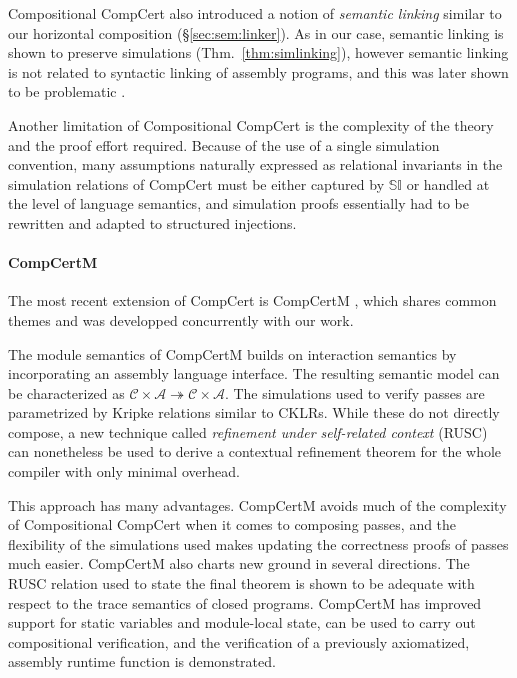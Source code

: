 \documentclass[sigplan,10pt,review,anonymous]{acmart}
\begin{document}
Compositional CompCert also introduced a notion of \emph{semantic linking}
similar to our horizontal composition
(\S\ref{sec:sem:linker}).
As in our case,
semantic linking is shown to preserve simulations
(Thm.~\ref{thm:simlinking}),
however semantic linking is not related to
syntactic linking of assembly programs,
and this was later shown to be problematic \cite{compcertm}.

Another limitation of Compositional CompCert
is the complexity of the theory
and the proof effort required.
Because of the use of a single simulation convention,
many assumptions naturally expressed as
relational invariants in the simulation relations of CompCert
must be either captured by $\mathbb{SI}$
or handled at the level of language semantics,
and simulation proofs
essentially had to be rewritten and adapted to
structured injections.


\paragraph{CompCertM} %

The most recent extension of CompCert is CompCertM \cite{compcertm},
which shares common themes and was developped concurrently
with our work.

The module semantics of CompCertM
builds on interaction semantics
by incorporating an assembly language interface.
The resulting semantic model can be characterized as
$\mathcal{C} \times \mathcal{A} \twoheadrightarrow
 \mathcal{C} \times \mathcal{A}$.
The simulations used to verify passes
are parametrized by Kripke relations similar to CKLRs.
While these do not directly compose,
a new technique called \emph{refinement under self-related context}
(RUSC)
can nonetheless be used to derive a contextual refinement theorem
for the whole compiler with only minimal overhead.

This approach has many advantages.
CompCertM avoids much of the complexity
of Compositional CompCert
when it comes to composing passes,
and the flexibility of the simulations used
makes updating the correctness proofs of passes much easier.
CompCertM also charts new ground in several directions.
The RUSC relation used to state the final theorem
is shown to be adequate with respect to the trace semantics
of closed programs.
CompCertM has improved support for static variables
and module-local state,
can be used to carry out compositional verification,
and the verification of a previously axiomatized,
assembly runtime function is demonstrated.
\end{document}
